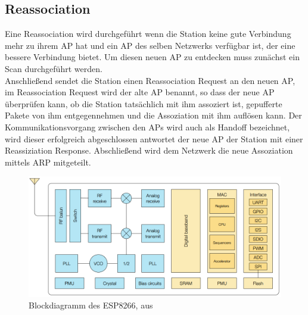 \subsection{Reassociation}
Eine Reassociation wird durchgeführt wenn die Station keine gute Verbindung mehr zu ihrem AP hat und ein AP des selben Netzwerks verfügbar ist, der eine bessere Verbindung bietet.
Um diesen neuen AP zu entdecken muss zunächst ein Scan durchgeführt werden. \\
Anschließend sendet die Station einen Reassociation Request an den neuen AP, im Reassociation Request wird der alte AP benannt, so dass der neue AP überprüfen kann, ob die Station tatsächlich mit ihm assoziert ist, gepufferte Pakete von ihm entgegennehmen und die Assoziation mit ihm auflösen kann.
Der Kommunikationsvorgang zwischen den APs wird auch als Handoff bezeichnet, wird dieser erfolgreich abgeschlossen antwortet der neue AP der Station mit einer Reassiziation Response.
Abschließend wird dem Netzwerk die neue Assoziation mittels ARP mitgeteilt.

\begin{figure}[h]
  \centering
	\includegraphics[width=\textwidth]{images/espblock.png}
  \caption{Blockdiagramm des ESP8266, aus \cite{espressif2017esp8266}}
  \label{fig:espblock}
\end{figure}

